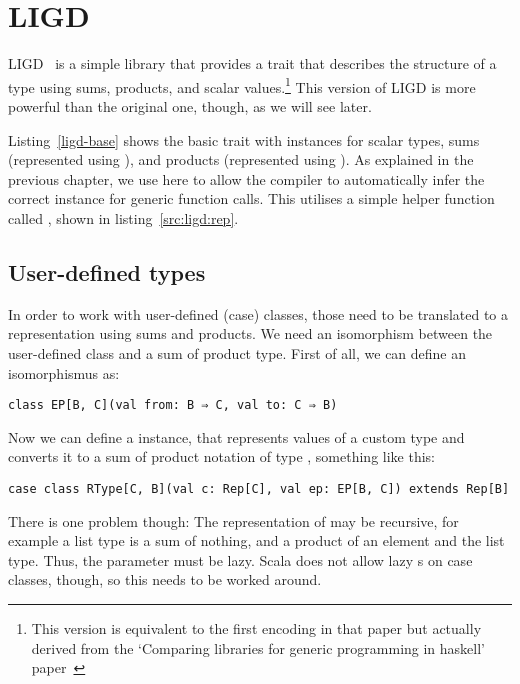 \section{LIGD}


LIGD~\cite{Cheney:2002:LIG:581690.581698} is a simple library that provides a  trait that describes
the structure of a type using sums, products, and scalar values.\footnote{This
version is equivalent to the first encoding in that paper but actually
derived from the `Comparing libraries for generic programming in haskell'
paper~\cite{DBLP:conf/haskell/RodriguezJJGKO08}}
This version of LIGD is more powerful than the original one, though, as we
will see later.

Listing~\ref{ligd-base} shows the basic  trait with instances for
scalar types, sums (represented using ), and products (represented
using ). As explained in the previous chapter, we use 
here to allow the compiler to automatically infer the correct 
instance for generic function calls. This  utilises a simple helper function called ,
shown in listing~\ref{src:ligd:rep}.


\subsection{User-defined types}
In order to work with user-defined (case) classes, those need to be
translated to a representation using sums and products. We need an
isomorphism between the user-defined class and a sum of product type. First
of all, we can define an isomorphismus as:
\begin{lstlisting}[gobble=2]
  class EP[B, C](val from: B ⇒ C, val to: C ⇒ B)
\end{lstlisting}
Now we can define a  instance, that represents values of a custom
type  and converts it to a sum of product notation of type ,
something like this:
\begin{lstlisting}[gobble=2]
  case class RType[C, B](val c: Rep[C], val ep: EP[B, C]) extends Rep[B]
\end{lstlisting}
There is one problem though: The representation of  may be recursive,
for example a list type is a sum of nothing, and a product of an element and
the list type. Thus, the parameter  must be lazy. Scala does not allow
lazy s on case classes, though, so this needs to be worked around.

